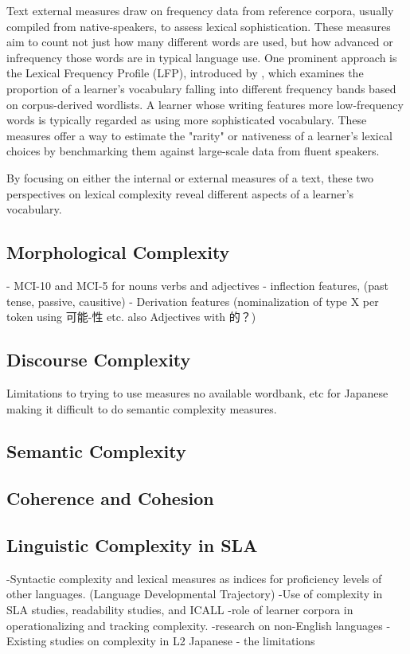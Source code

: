 Text external measures draw on frequency data from reference corpora, usually compiled from native-speakers, to
assess lexical sophistication.
These
measures aim
to count not just how many different words are used, but how advanced or infrequency those words are in typical
language
use. One prominent approach is the Lexical Frequency Profile (LFP), introduced by \cite{Laufer1995}, which examines
the proportion of a learner's vocabulary falling into different frequency bands based on corpus-derived wordlists. A
learner whose writing features more low-frequency words is typically regarded as using more sophisticated vocabulary.
These measures offer a way to estimate the "rarity" or nativeness of a learner's lexical choices by benchmarking
them against large-scale data from fluent speakers.

By focusing on either the internal or external measures of a text, these two perspectives on lexical complexity
reveal different aspects of a learner's vocabulary.

\subsection{Morphological Complexity}
    - MCI-10 and MCI-5 for nouns verbs and adjectives
    - inflection features, (past tense, passive, causitive)
    - Derivation features (nominalization of type X per token using 可能-性 etc. also Adjectives with 的？)


\subsection{Discourse Complexity}
Limitations to trying to use measures no available wordbank, etc for Japanese making it difficult to do semantic
complexity measures.
\subsection{Semantic Complexity}
\subsection{Coherence and Cohesion}

\subsection{Linguistic Complexity in SLA}
-Syntactic complexity and lexical measures as indices for proficiency levels of other languages. (Language Developmental Trajectory)
-Use of complexity in SLA studies, readability studies, and ICALL
-role of learner corpora in operationalizing and tracking complexity.
-research on non-English languages
-Existing studies on complexity in L2 Japanese - the limitations

